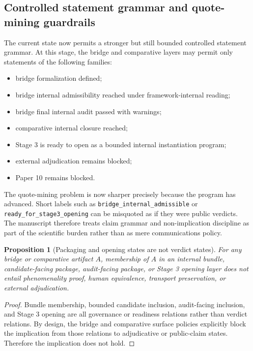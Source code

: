\documentclass[11pt,a4paper]{article}
\newtheorem{proposition}[theorem]{Proposition}
\theoremstyle{definition}
\begin{document}
\subsection{Controlled statement grammar and quote-mining guardrails}
The current state now permits a stronger but still bounded controlled statement grammar. At this stage, the bridge and comparative layers may permit only statements of the following families:
\begin{itemize}[leftmargin=1.5em]
\item bridge formalization defined;
\item bridge internal admissibility reached under framework-internal reading;
\item bridge final internal audit passed with warnings;
\item comparative internal closure reached;
\item Stage 3 is ready to open as a bounded internal instantiation program;
\item external adjudication remains blocked;
\item Paper 10 remains blocked.
\end{itemize}
The quote-mining problem is now sharper precisely because the program has advanced. Short labels such as \texttt{bridge\_internal\_admissible} or \texttt{ready\_for\_stage3\_opening} can be misquoted as if they were public verdicts. The manuscript therefore treats claim grammar and non-implication discipline as part of the scientific burden rather than as mere communications policy.

\begin{proposition}[Packaging and opening states are not verdict states]
For any bridge or comparative artifact $A$, membership of $A$ in an internal bundle, candidate-facing package, audit-facing package, or Stage 3 opening layer does not entail phenomenality proof, human equivalence, transport preservation, or external adjudication.
\end{proposition}

\begin{proof}
Bundle membership, bounded candidate inclusion, audit-facing inclusion, and Stage 3 opening are all governance or readiness relations rather than verdict relations. By design, the bridge and comparative surface policies explicitly block the implication from those relations to adjudicative or public-claim states. Therefore the implication does not hold.
\end{proof}
\end{document}
